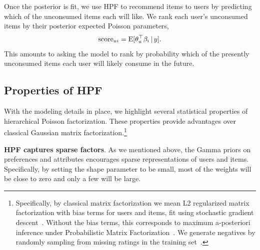 
Once the posterior is fit, we use HPF to recommend items to users by
predicting which of the unconsumed items each will like.  We rank each
user's unconsumed items by their posterior expected Poisson
parameters,
\begin{equation}
  \label{eq:score}
  \textrm{score}_{ui} = \textrm{E}[\theta_u^\top \beta_i \,\vert\, y].
\end{equation}
This amounts to asking the model to rank by probability which of the
presently unconsumed items each user will likely consume in the
future.

\subsection{Properties of HPF}
\label{sec:properties}
With the modeling details in place, we highlight several statistical
properties of hierarchical Poisson factorization.  These properties
provide advantages over classical Gaussian matrix
factorization.\footnote{Specifically, by classical matrix
  factorization we mean L2 regularized matrix factorization with bias
  terms for users and items, fit using stochastic gradient
  descent~\cite{Koren:2009}. Without the bias terms, this corresponds
  to maximum a-posteriori inference under Probabilistic Matrix
  Factorization~\cite{Salakhutdinov:2008a}. We generate negatives by
  randomly sampling from missing ratings in the training
  set~\cite{Gantner:2012p9364,Dror:2012a,Paquet:2013p9197}.}

{\bf HPF captures sparse factors}.  As we mentioned above, the Gamma
priors on preferences and attributes encourages sparse representations
of users and items.  Specifically, by setting the shape parameter to
be small, most of the weights will be close to zero and only a few
will be large.


